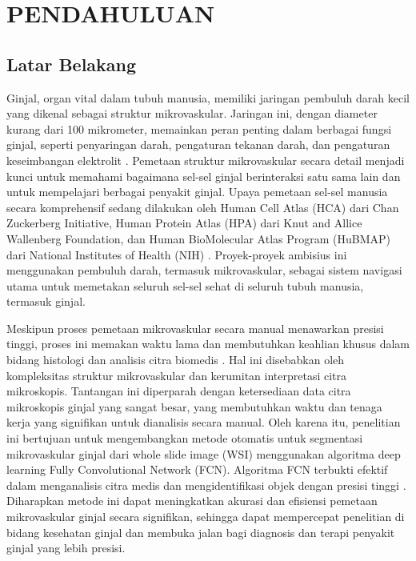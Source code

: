 \chapter{PENDAHULUAN}
\section{Latar Belakang}
\label{section:latarbelakang}
\noindent Ginjal, organ vital dalam tubuh manusia, memiliki jaringan pembuluh darah kecil yang dikenal sebagai struktur mikrovaskular. Jaringan ini, dengan diameter kurang dari 100 mikrometer, memainkan peran penting dalam berbagai fungsi ginjal, seperti penyaringan darah, pengaturan tekanan darah, dan pengaturan keseimbangan elektrolit \cite{hu_multi-scale_2023}. Pemetaan struktur mikrovaskular secara detail menjadi kunci untuk memahami bagaimana sel-sel ginjal berinteraksi satu sama lain dan untuk mempelajari berbagai penyakit ginjal.
Upaya pemetaan sel-sel manusia secara komprehensif sedang dilakukan oleh Human Cell Atlas (HCA) dari Chan Zuckerberg Initiative, Human Protein Atlas (HPA) dari Knut and Allice Wallenberg Foundation, dan Human BioMolecular Atlas Program (HuBMAP) dari National Institutes of Health (NIH) \cite{weber_considerations_2020}. Proyek-proyek ambisius ini menggunakan pembuluh darah, termasuk mikrovaskular, sebagai sistem navigasi utama untuk memetakan seluruh sel-sel sehat di seluruh tubuh manusia, termasuk ginjal.

\noindent Meskipun proses pemetaan mikrovaskular secara manual menawarkan presisi tinggi, proses ini memakan waktu lama dan membutuhkan keahlian khusus dalam bidang histologi dan analisis citra biomedis \cite{hu_multi-scale_2023,weber_considerations_2020}. Hal ini disebabkan oleh kompleksitas struktur mikrovaskular dan kerumitan interpretasi citra mikroskopis. Tantangan ini diperparah dengan ketersediaan data citra mikroskopis ginjal yang sangat besar, yang membutuhkan waktu dan tenaga kerja yang signifikan untuk dianalisis secara manual. Oleh karena itu, penelitian ini bertujuan untuk mengembangkan metode otomatis untuk segmentasi mikrovaskular ginjal dari whole slide image (WSI) menggunakan algoritma deep learning Fully Convolutional Network (FCN). Algoritma FCN terbukti efektif dalam menganalisis citra medis dan mengidentifikasi objek dengan presisi tinggi \cite{huang_fully_2022}. Diharapkan metode ini dapat meningkatkan akurasi dan efisiensi pemetaan mikrovaskular ginjal secara signifikan, sehingga dapat mempercepat penelitian di bidang kesehatan ginjal dan membuka jalan bagi diagnosis dan terapi penyakit ginjal yang lebih presisi. 

